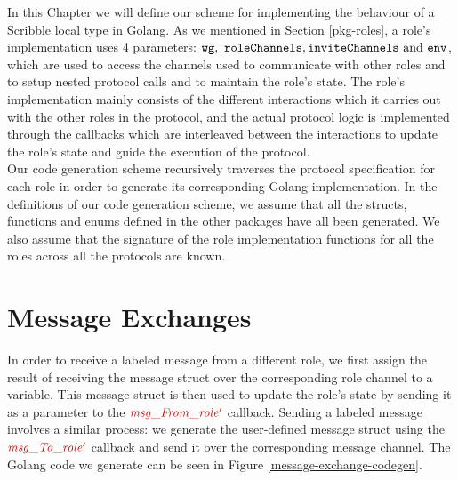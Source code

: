 \documentclass[12pt,twoside]{report}
\begin{document}
In this Chapter we will define our scheme for implementing the behaviour of a Scribble local type in Golang. As we mentioned in Section \ref{pkg-roles}, a role's implementation uses 4 parameters: $\varname{wg},\ \varname{roleChannels}, \varname{inviteChannels}\ \text{and}\ \varname{env}$, which are used to access the channels used to communicate with other roles and to setup nested protocol calls and to maintain the role's state. The role's implementation mainly consists of the different interactions which it carries out with the other roles in the protocol, and the actual protocol logic is implemented through the callbacks which are interleaved between the interactions to update the role's state and guide the execution of the protocol.\\

Our code generation scheme recursively traverses the protocol specification for each role in order to generate its corresponding Golang implementation. In the definitions of our code generation scheme, we assume that all the structs, functions and enums defined in the other packages have all been generated. We also assume that the signature of the role implementation functions for all the roles across all the protocols are known. 

\section{Message Exchanges}\label{msg-exchanges-impl}

In order to receive a labeled message from a different role, we first assign the result of receiving the message struct over the corresponding role channel to a variable. This message struct is then used to update the role's state by sending it as a parameter to the $\functionname{msg\_From\_role'}$ callback. Sending a labeled message involves a similar process: we generate the user-defined message struct using the $\functionname{msg\_To\_role'}$ callback and send it over the corresponding message channel. The Golang code we generate can be seen in Figure \ref{message-exchange-codegen}.

\clearpage
\end{document}
